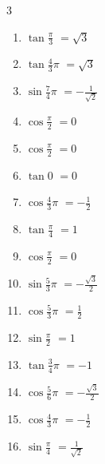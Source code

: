 \begin{multicols}{3}
\begin{enumerate}
  \item $\displaystyle \tan{\frac{\pi}{3}}$
        $\displaystyle =\sqrt{3}$

  \item $\displaystyle \tan{\frac{4}{3}\pi}$
        $\displaystyle =\sqrt{3}$

  \item $\displaystyle \sin{\frac{7}{4}\pi}$
        $\displaystyle =-\frac{1}{\sqrt{2}}$

  \item $\displaystyle \cos{\frac{\pi}{2}}$
        $\displaystyle =0$

  \item $\displaystyle \cos{\frac{\pi}{2}}$
        $\displaystyle =0$

  \item $\displaystyle \tan{0}$
        $\displaystyle =0$

  \item $\displaystyle \cos{\frac{4}{3}\pi}$
        $\displaystyle =-\frac{1}{2}$

  \item $\displaystyle \tan{\frac{\pi}{4}}$
        $\displaystyle =1$

  \item $\displaystyle \cos{\frac{\pi}{2}}$
        $\displaystyle =0$

\columnbreak %

\resetques

  \item $\displaystyle \sin{\frac{5}{3}\pi}$
        $\displaystyle =-\frac{\sqrt{3}}{2}$

  \item $\displaystyle \cos{\frac{5}{3}\pi}$
        $\displaystyle =\frac{1}{2}$

  \item $\displaystyle \sin{\frac{\pi}{2}}$
        $\displaystyle =1$

  \item $\displaystyle \tan{\frac{3}{4}\pi}$
        $\displaystyle =-1$

  \item $\displaystyle \cos{\frac{5}{6}\pi}$
        $\displaystyle =-\frac{\sqrt{3}}{2}$

  \item $\displaystyle \cos{\frac{4}{3}\pi}$
        $\displaystyle =-\frac{1}{2}$

  \item $\displaystyle \sin{\frac{\pi}{4}}$
        $\displaystyle =\frac{1}{\sqrt{2}}$


\end{enumerate}
\end{multicols}
